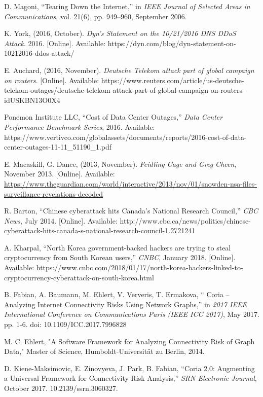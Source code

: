 \documentclass[conference, 11pt]{IEEEtran}
\begin{document}
\begin{thebibliography}{00}
D. Magoni, ``Tearing Down the Internet,'' in \textit{ IEEE Journal of Selected Areas in Communications}, vol. 21(6), pp. 949–960, September 2006. %


K. York, (2016, October). \textit{Dyn’s Statement on the 10/21/2016 DNS DDoS Attack}. 2016. [Online]. Available: https://dyn.com/blog/dyn-statement-on-10212016-ddos-attack/ %

E. Auchard, (2016, November). \textit{Deutsche Telekom attack part of global campaign on routers}. [Online]. Available: https://www.reuters.com/article/us-deutsche-telekom-outages/deutsche-telekom-attack-part-of-global-campaign-on-routers-idUSKBN13O0X4 %

Ponemon Institute LLC, ``Cost of Data Center Outages,'' \textit{Data Center Performance Benchmark Series}, 2016. Available: https://www.vertivco.com/globalassets/documents/reports/2016-cost-of-data-center-outages-11-11\_51190\_1.pdf %

 E. Macaskill, G. Dance, (2013, November). \textit{Feidling Cage and Greg Chcen}, November 2013. [Online]. Available: \url{https://www.theguardian.com/world/interactive/2013/nov/01/snowden-nsa-files-surveillance-revelations-decoded} %

R. Barton, ``Chinese cyberattack hits Canada's National Research Council,'' \textit{CBC News}, July 2014. [Online]. Available: http://www.cbc.ca/news/politics/chinese-cyberattack-hits-canada-s-national-research-council-1.2721241 %

A. Kharpal, ``North Korea government-backed hackers are trying to steal cryptocurrency from South Korean users,'' \textit{CNBC}, January 2018. [Online]. Available: https://www.cnbc.com/2018/01/17/north-korea-hackers-linked-to-cryptocurrency-cyberattack-on-south-korea.html %

B. Fabian, A. Baumann, M. Ehlert, V. Ververis, T. Ermakova, `` Coria – Analyzing Internet Connectivity Risks Using Network Graphs,'' in \textit{2017 IEEE International Conference on Communications Paris (IEEE ICC 2017)}, May 2017.  pp. 1-6. doi: 10.1109/ICC.2017.7996828 %

M. C. Ehlert, "A Software Framework for Analyzing Connectivity Risk of Graph Data," Master of Science, Humboldt-Universität zu Berlin, 2014. %

 D. Kiene-Maksimovic, E. Zinovyeva, J. Park, B. Fabian, ``Coria 2.0: Augmenting a Universal Framework for Connectivity Risk Analysis,'' \textit{SRN Electronic Journal}, October 2017. 10.2139/ssrn.3060327.  %


\end{thebibliography}
\end{document}

